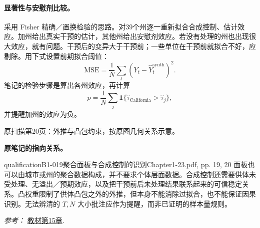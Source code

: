 {\paragraph{显著性与安慰剂比较。}
采用 Fisher 精确／置换检验的思路。对39个州逐一重新拟合合成控制、估计效应。加州给出真实干预的估计，其他州给出安慰剂效应。若没有处理的州也出现很大效应，就有问题。干预后的变异大于干预前；一些单位在干预前就拟合不好，应剔除。用下式设置前期拟合阈值：
\[\mathrm{MSE}=\frac1N\sum_t(Y_t-\widehat Y_t^{\mathrm{synth}})^2.\]
笔记的检验步骤是算出各州效应，再计算
\[p=\frac1N\sum_j\mathbf1\{\hat\tau_{\mathrm{California}}>\hat\tau_j\},\]
并提醒加州的效应为负。

\begin{center}
\par{\small 原扫描第20页：外推与凸包约束，按原图几何关系示意。}
\end{center}
\par{}\smallskip\textbf{原笔记的指向关系。}\par\smallskip
{}
\begin{reviewnote}{qualification}{B1-019}{聚合面板与合成控制的识别}{Chapter1-23.pdf, pp. 19, 20}
面板也可以由城市或州的聚合数据构成，并不要求个体层面数据。合成控制还需要供体未受处理、无溢出／预期效应，以及把干预前后未处理结果联系起来的可信稳定关系。凸权重限制了供体凸包之外的外推，但本身不能消除过拟合，也不能保证因果识别。无法辨清的 $T,N$ 大小批注应作为提醒，而非已证明的样本量规则。
\par\smallskip\textit{参考：} \href{https://matheusfacure.github.io/python-causality-handbook/15-Synthetic-Control.html}{教材第15章}.
\end{reviewnote}

}
